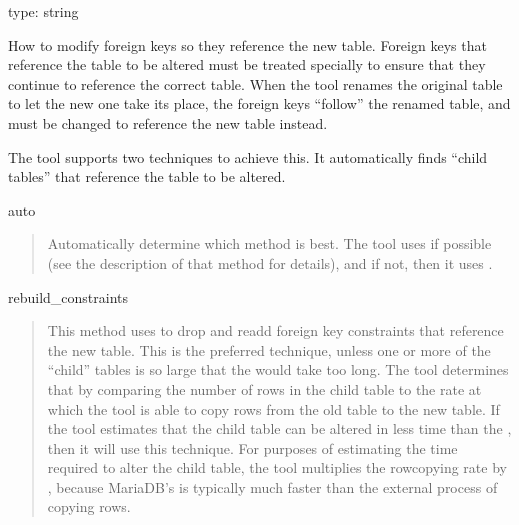\documentclass[letterpaper,10pt,english]{sphinxmanual}
\begin{document}
\begin{fulllineitems}
\label{\detokenize{mariadb-schema-change:cmdoption-mariadb-schema-change-alter-foreign-keys-method}}
type: string

How to modify foreign keys so they reference the new table.  Foreign keys that
reference the table to be altered must be treated specially to ensure that they
continue to reference the correct table. When the tool renames the original
table to let the new one take its place, the foreign keys “follow” the renamed
table, and must be changed to reference the new table instead.

The tool supports two techniques to achieve this. It automatically finds “child
tables” that reference the table to be altered.

auto
\begin{quote}

Automatically determine which method is best.  The tool uses
 if possible (see the description of that method for
details), and if not, then it uses .
\end{quote}

rebuild\_constraints
\begin{quote}

This method uses  to drop and re\sphinxhyphen{}add foreign key constraints that
reference the new table.  This is the preferred technique, unless one or more of
the “child” tables is so large that the  would take too long.  The tool
determines that by comparing the number of rows in the child table to the rate
at which the tool is able to copy rows from the old table to the new table. If
the tool estimates that the child table can be altered in less time than the
{\hyperref[\detokenize{mariadb-schema-change:cmdoption-mariadb-schema-change-chunk-time}]{}}, then it will use this technique.  For purposes of estimating
the time required to alter the child table, the tool multiplies the row\sphinxhyphen{}copying
rate by {\hyperref[\detokenize{mariadb-schema-change:cmdoption-mariadb-schema-change-chunk-size-limit}]{}}, because MariaDB’s  is typically
much faster than the external process of copying rows.


\end{quote}
\end{fulllineitems}
\end{document}
